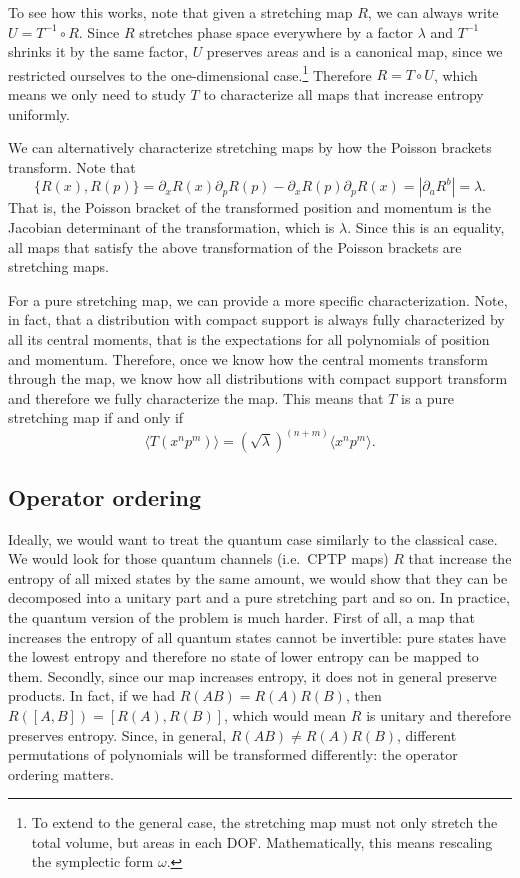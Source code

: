 \documentclass{article}
\begin{document}
To see how this works, note that given a stretching map $R$, we can always write $U = T^{-1} \circ R$. Since $R$ stretches phase space everywhere by a factor $\lambda$ and $T^{-1}$ shrinks it by the same factor, $U$ preserves areas and is a canonical map, since we restricted ourselves to the one-dimensional case.\footnote{To extend to the general case, the stretching map must not only stretch the total volume, but areas in each DOF. Mathematically, this means rescaling the symplectic form $\omega$.} Therefore $R = T \circ U$, which means we only need to study $T$ to characterize all maps that increase entropy uniformly.

We can alternatively characterize stretching maps by how the  Poisson brackets transform. Note that
\begin{equation}
    \{R(x),R(p)\} = \partial_x R(x) \partial_p R(p) - \partial_x R(p) \partial_p R(x) = | \partial_a R^b | = \lambda.
\end{equation}
That is, the Poisson bracket of the transformed position and momentum is the Jacobian determinant of the transformation, which is $\lambda$. Since this is an equality, all maps that satisfy the above transformation of the Poisson brackets are stretching maps.

For a pure stretching map, we can provide a more specific characterization. Note, in fact, that a distribution with compact support is always fully characterized by all its central moments, that is the expectations for all polynomials of position and momentum. Therefore, once we know how the central moments transform through the map, we know how all distributions with compact support transform and therefore we fully characterize the map. This means that $T$ is a pure stretching map if and only if
\begin{equation}
    \langle T(x^np^m) \rangle = (\sqrt{\lambda})^{(n+m)} \langle x^n p^m \rangle.
\end{equation}

\subsection{Operator ordering}

Ideally, we would want to treat the quantum case similarly to the classical case. We would look for those quantum channels (i.e.~CPTP maps) $R$ that increase the entropy of all mixed states by the same amount, we would show that they can be decomposed into a unitary part and a pure stretching part and so on. In practice, the quantum version of the problem is much harder. First of all, a map that increases the entropy of all quantum states cannot be invertible: pure states have the lowest entropy and therefore no state of lower entropy can be mapped to them. Secondly, since our map increases entropy, it does not in general preserve products. In fact, if we had $R(AB) = R(A)R(B)$, then $R([A,B]) = [R(A),R(B)]$, which would mean $R$ is unitary and therefore preserves entropy. Since, in general, $R(AB) \neq R(A)R(B)$, different permutations of polynomials will be transformed differently: the operator ordering matters.
\end{document}
